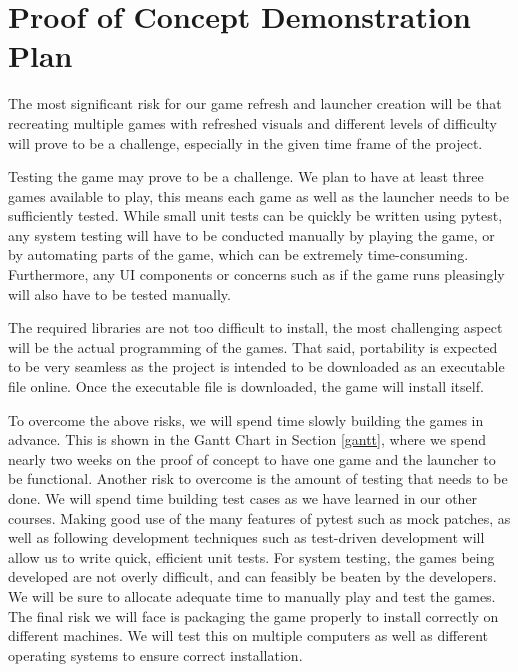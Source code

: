 \documentclass{article}
\begin{document}
\section{Proof of Concept Demonstration Plan}

The most significant risk for our game refresh and launcher creation will be that recreating multiple games with refreshed visuals and different levels of difficulty will prove to be a challenge, especially in the given time frame of the project.

\iffalse
Also, we may find testing to be in the middle between manageable and complicated. On one hand, running pytest for some unit tests will be simple but on the other, usability tests, such as if the games and launcher will run pleasingly, will need to be conducted manually and may more time than expected.
\fi

Testing the game may prove to be a challenge. We plan to have at least three games available to play, this means each game as well as the launcher needs to be sufficiently tested.  While small unit tests can be quickly be written using pytest, any system testing will have to be conducted manually by playing the game, or by automating parts of the game, which can be extremely time-consuming. Furthermore, any UI components or concerns such as if the game runs pleasingly will also have to be tested manually.

The required libraries are not too difficult to install, the most challenging aspect will be the actual programming of the games. That said, portability is expected to be very seamless as the project is intended to be downloaded as an executable file online. Once the executable file is downloaded, the game will install itself.

To overcome the above risks, we will spend time slowly building the games in advance. This is shown in the Gantt Chart in Section \ref{gantt}, where we spend nearly two weeks on the proof of concept to have one game and the launcher to be functional. Another risk to overcome is the amount of testing that needs to be done.  We will spend time building test cases as we have learned in our other courses. Making good use of the many features of pytest such as mock patches, as well as following development techniques such as test-driven development will allow us to write quick, efficient unit tests. For system testing, the games being developed are not overly difficult, and can feasibly be beaten by the developers. We will be sure to allocate adequate time to manually play and test the games. The final risk we will face is packaging the game properly to install correctly on different machines. We will test this on multiple computers as well as different operating systems to ensure correct installation.
\end{document}
